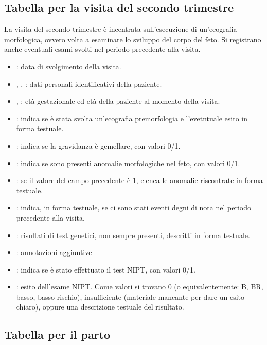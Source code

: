 \subsection{Tabella per la visita del secondo trimestre}
\label{secondtrimester}

La visita del secondo trimestre è incentrata sull'esecuzione di un'ecografia morfologica, ovvero volta a esaminare lo sviluppo del corpo del feto.
Si registrano anche eventuali esami svolti nel periodo precedente alla visita.

\begin{itemize}
\item {}: data di svolgimento della visita.
\item {}, , : dati personali identificativi della paziente.
\item {}, : età gestazionale ed età della paziente al momento della visita.
\item {}: indica se è stata svolta un'ecografia premorfologia e l'evetntuale esito in forma testuale.
\item {}: indica se la gravidanza è gemellare, con valori 0/1.
\item {}: indica se sono presenti anomalie morfologiche nel feto, con valori 0/1.
\item {}: se il valore del campo precedente è 1, elenca le anomalie riscontrate in forma testuale.
\item {}: indica, in forma testuale, se ci sono stati eventi degni di nota nel periodo precedente alla visita.
\item {}: risultati di test genetici, non sempre presenti, descritti in forma testuale.
\item {}: annotazioni aggiuntive
\item {}: indica se è stato effettuato il test NIPT, con valori 0/1.
\item {}: esito dell'esame NIPT. Come valori si trovano 0 (o equivalentemente: B, BR, basso, basso rischio), insufficiente (materiale mancante per dare un esito chiaro), oppure una descrizione testuale del risultato.
\end{itemize}

\subsection{Tabella per il parto}
\label{delivery}


